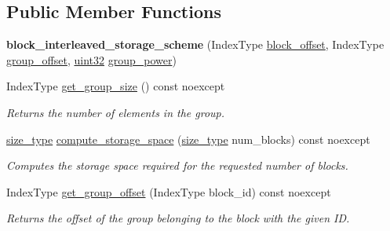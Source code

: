 \subsection*{Public Member Functions}
\begin{DoxyCompactItemize}
\item 
\mbox{\label{structgko_1_1preconditioner_1_1block__interleaved__storage__scheme_a80d0c7d6caf4b5a30bdf9fdecec6a8bd}} 
{\bfseries block\+\_\+interleaved\+\_\+storage\+\_\+scheme} (Index\+Type \hyperlink{structgko_1_1preconditioner_1_1block__interleaved__storage__scheme_ada09b37f171d433cc74818961fc6eccc}{block\+\_\+offset}, Index\+Type \hyperlink{structgko_1_1preconditioner_1_1block__interleaved__storage__scheme_aa8a6723ef709e69bda55eaabaeee582e}{group\+\_\+offset}, \hyperlink{namespacegko_a318c831e3fe269ba04c6ed8bf5a71073}{uint32} \hyperlink{structgko_1_1preconditioner_1_1block__interleaved__storage__scheme_a8fa279f4178c767bdbf52ef4d7e23ad1}{group\+\_\+power})
\item 
Index\+Type \hyperlink{structgko_1_1preconditioner_1_1block__interleaved__storage__scheme_af5eee19f00b1cd4c378ac3410be72093}{get\+\_\+group\+\_\+size} () const noexcept
\begin{DoxyCompactList}\small\item\em Returns the number of elements in the group. \end{DoxyCompactList}\item 
\hyperlink{namespacegko_a6e5c95df0ae4e47aab2f604a22d98ee7}{size\+\_\+type} \hyperlink{structgko_1_1preconditioner_1_1block__interleaved__storage__scheme_ae46b38432c1e1b87d5743a649f2cfe84}{compute\+\_\+storage\+\_\+space} (\hyperlink{namespacegko_a6e5c95df0ae4e47aab2f604a22d98ee7}{size\+\_\+type} num\+\_\+blocks) const noexcept
\begin{DoxyCompactList}\small\item\em Computes the storage space required for the requested number of blocks. \end{DoxyCompactList}\item 
Index\+Type \hyperlink{structgko_1_1preconditioner_1_1block__interleaved__storage__scheme_a66a04b4dc90547fde872359c78ee22a4}{get\+\_\+group\+\_\+offset} (Index\+Type block\+\_\+id) const noexcept
\begin{DoxyCompactList}\small\item\em Returns the offset of the group belonging to the block with the given ID. \end{DoxyCompactList}\item 

\end{DoxyCompactItemize}
